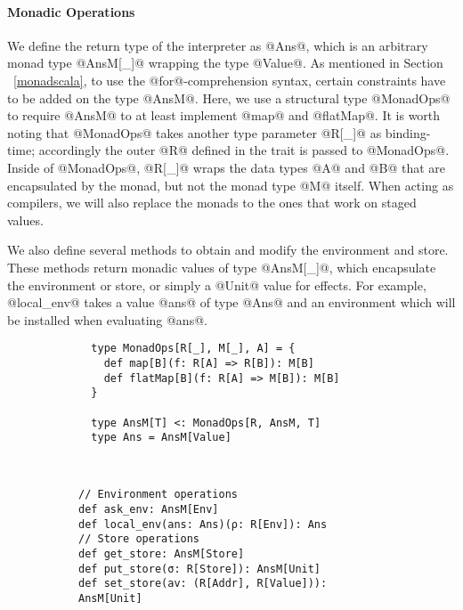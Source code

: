 \paragraph{Monadic Operations} We define the return type of the interpreter as
@Ans@, which is an arbitrary monad type @AnsM[_]@ wrapping the type @Value@. 
As mentioned in Section ~\ref{monadscala}, to use the @for@-comprehension
syntax, certain constraints have to be added on the type @AnsM@. Here, we use a
structural type @MonadOps@ to require @AnsM@ to at least implement @map@ and
@flatMap@. It is worth noting that @MonadOps@ takes another type parameter
@R[_]@ as binding-time; accordingly the outer @R@ defined in the trait is passed
to @MonadOps@. Inside of @MonadOps@, @R[_]@ wraps the data types @A@ and @B@ that are
encapsulated by the monad, but not the monad type @M@ itself. When acting as
compilers, we will also replace the monads to the ones that work on staged
values.

We also define several methods to obtain and modify the environment and store.
These methods return monadic values of type @AnsM[_]@, which encapsulate the 
environment or store, or simply a @Unit@ value for effects.
For example, @local_env@ takes a value @ans@ of type @Ans@ and an environment 
which will be installed when evaluating @ans@.

\begin{figure}[h!]
  \centering
  \begin{subfigure}[b]{0.45\textwidth}
    \begin{lstlisting}
  type MonadOps[R[_], M[_], A] = {
    def map[B](f: R[A] => R[B]): M[B]
    def flatMap[B](f: R[A] => M[B]): M[B]
  }
  
  type AnsM[T] <: MonadOps[R, AnsM, T]
  type Ans = AnsM[Value]
    \end{lstlisting}
  \end{subfigure}
  ~
  \begin{subfigure}[b]{0.55\textwidth}
    \begin{lstlisting}
// Environment operations
def ask_env: AnsM[Env]
def local_env(ans: Ans)(ρ: R[Env]): Ans
// Store operations
def get_store: AnsM[Store]
def put_store(σ: R[Store]): AnsM[Unit]
def set_store(av: (R[Addr], R[Value])): AnsM[Unit]
    \end{lstlisting}
  \end{subfigure}
\end{figure}

